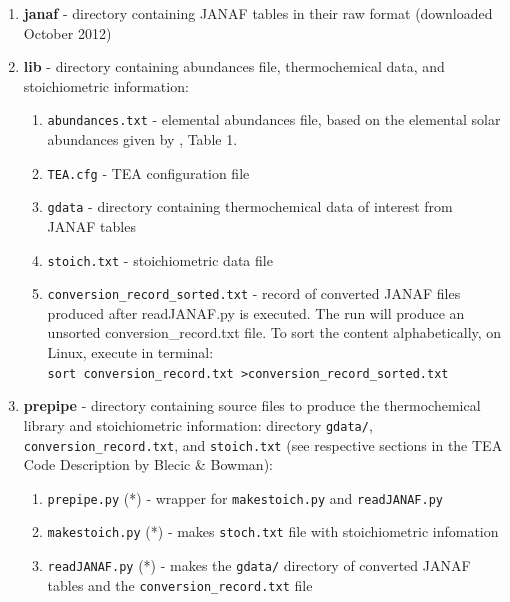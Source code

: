 {\begin{enumerate}
\item {\bf janaf } - directory containing JANAF tables in their raw
  format (downloaded October 2012)

\item {\bf lib } - directory containing abundances file,
  thermochemical data, and stoichiometric information:
\begin{enumerate}
\setlength\itemsep{0ex}
\setlength\topsep{0ex}
\setlength\partopsep{0ex}
\setlength\parsep{0ex}
\item \texttt{abundances.txt} - elemental abundances file, based on
  the elemental solar abundances given by
  \citet{AsplundEtal2009-SunAbundances}, Table 1.
\item \texttt{TEA.cfg} - TEA configuration file
\item \texttt{gdata} - directory containing thermochemical data of
  interest from JANAF tables
\item \texttt{stoich.txt} - stoichiometric data file
\item \texttt{conversion\_record\_sorted.txt} - record of converted
  JANAF files produced after readJANAF.py is executed. The run will
  produce an unsorted conversion\_record.txt file. To sort the content
  alphabetically, on Linux, execute in terminal: \\
  \texttt{sort conversion\_record.txt  >conversion\_record\_sorted.txt}
\end{enumerate}

\item {\bf prepipe } - directory containing source files to produce
  the thermochemical library and stoichiometric information: directory
  \texttt{gdata/}, \texttt{conversion\_record.txt}, and \newline
  \texttt{stoich.txt} (see respective sections in the TEA Code
  Description by Blecic \& Bowman):
\begin{enumerate}
\setlength\itemsep{0ex}
\setlength\topsep{0ex}
\setlength\partopsep{0ex}
\setlength\parsep{0ex}
\item \texttt{prepipe.py} (*) - wrapper for \texttt{makestoich.py} and
  \texttt{readJANAF.py}
\item \texttt{makestoich.py} (*) - makes \texttt{stoch.txt} file with
  stoichiometric infomation
\item \texttt{readJANAF.py} (*) - makes the \texttt{gdata/} directory
   of converted JANAF tables and the \texttt{conversion\_record.txt} file
\end{enumerate}


\end{enumerate}}

